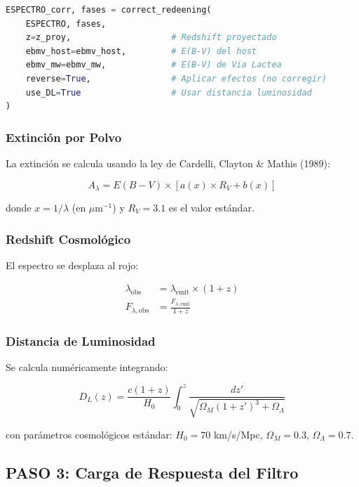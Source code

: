 \documentclass[11pt,a4paper]{article}
\begin{document}
\begin{lstlisting}[language=Python, caption=Correcciones cosmológicas]
ESPECTRO_corr, fases = correct_redeening(
    ESPECTRO, fases, 
    z=z_proy,                    # Redshift proyectado
    ebmv_host=ebmv_host,         # E(B-V) del host
    ebmv_mw=ebmv_mw,             # E(B-V) de Via Lactea
    reverse=True,                # Aplicar efectos (no corregir)
    use_DL=True                  # Usar distancia luminosidad
)
\end{lstlisting}

\subsubsection{Extinción por Polvo}

La extinción se calcula usando la ley de Cardelli, Clayton \& Mathis (1989):

\begin{equation}
A_\lambda = E(B-V) \times \left[ a(x) \times R_V + b(x) \right]
\end{equation}

donde $x = 1/\lambda$ (en $\mu$m$^{-1}$) y $R_V = 3.1$ es el valor estándar.

\subsubsection{Redshift Cosmológico}

El espectro se desplaza al rojo:

\begin{align}
\lambda_{\text{obs}} &= \lambda_{\text{emit}} \times (1 + z) \\
F_{\lambda,\text{obs}} &= \frac{F_{\lambda,\text{emit}}}{1 + z}
\end{align}

\subsubsection{Distancia de Luminosidad}

Se calcula numéricamente integrando:

\begin{equation}
D_L(z) = \frac{c(1+z)}{H_0} \int_0^z \frac{dz'}{\sqrt{\Omega_M(1+z')^3 + \Omega_\Lambda}}
\end{equation}

con parámetros cosmológicos estándar: $H_0 = 70$ km/s/Mpc, $\Omega_M = 0.3$, $\Omega_\Lambda = 0.7$.

\subsection{PASO 3: Carga de Respuesta del Filtro}
\end{document}
